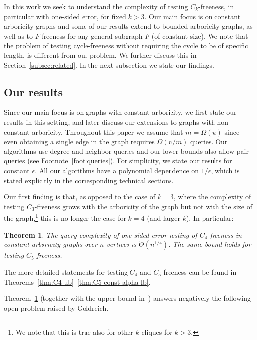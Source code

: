 \documentclass{article}
\newcommand{\eps}{\epsilon}
\newtheorem{theorem}{Theorem}
\newcommand{\ICALPCR}[1]{{#1}}
\begin{document}
In this work we seek to understand the complexity of testing $C_k$-freeness, in particular with one-sided error, for fixed $k> 3$. Our main focus is on constant arboricity graphs and some of our results extend to bounded arboricity graphs, as well as to $F$-freeness for any general subgraph $F$ (of constant size). 
We note that the problem of testing cycle-freeness
without requiring the cycle to be of specific length, is  different from our problem. We further discuss this in Section~\ref{subsec:related}.
In the next subsection we state our findings.



\subsection{Our results}

Since our main focus is on graphs with constant arboricity, we first state our results in this setting, and later discuss our extensions to graphs with non-constant arboricity.
Throughout this paper we assume that $m = \Omega(n)$ since  %
even obtaining a single edge in the graph requires $\Omega(n/m)$ queries. 
Our algorithms use degree and neighbor queries and our lower bounds also allow pair queries (see Footnote~\ref{foot:queries}).
For simplicity, we state our results for constant $\epsilon$. All our algorithms have a polynomial dependence on $1/\eps$, which is stated explicitly in the corresponding technical sections.




Our first finding is that, as opposed to the case of $k=3$, where the complexity of testing $C_3$-freeness grows with the arboricity of the graph but not with the size of the graph,\footnote{We note that this is true also for other $k$-cliques for $k > 3$.} this is no longer the case for $k=4$ (and larger $k$). In particular: 

\begin{theorem}\label{thm:C4-5}
The query complexity of one-sided error testing of $C_4$-freeness in constant-arboricity graphs over $n$ vertices is $\widetilde{\Theta}(n^{1/4})$.
The same bound holds for testing $C_5$-freeness.
\end{theorem}
 The more detailed statements for testing $C_4$ and $C_5$ freeness 
can be found in Theorems~\ref{thm:C4-ub}--\ref{thm:C5-const-alpha-lb}.

Theorem~\ref{thm:C4-5} \ICALPCR{(together with the upper bound in~\cite{GR-bound})}
answers negatively  the following open problem raised by Goldreich.
\end{document}
